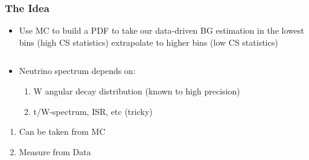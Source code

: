 \documentclass{beamer}
\begin{document}
\begin{frame}
 \frametitle{The Idea}
 \begin{itemize}
  \item Use MC to build a \MHT PDF to take our data-driven BG estimation in the lowest \MHT bins (high CS statistics) extrapolate to higher \MHT bins (low CS statistics)
 \end{itemize}
  \begin{columns}
  \begin{column}{0.45\textwidth}
   \begin{itemize}
    \item Neutrino spectrum depends on:
    \begin{enumerate}
     \item W angular decay distribution (known to high precision)
     \item t/W-\pt spectrum, ISR, etc (tricky)
    \end{enumerate}
    \end{itemize}
    \begin{enumerate}
     \item Can be taken from MC
     \item Measure from Data
    \end{enumerate}
  \end{column}
  \begin{column}{0.55\textwidth}
  \end{column}
 \end{columns}
\end{frame}
\end{document}
